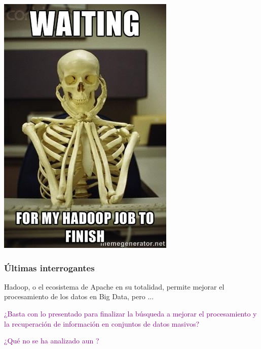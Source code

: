 \documentclass[
10pt, %
aspectratio=169, %
]{beamer}
\begin{document}
	\begin{frame}
		
		\centering
		\includegraphics[height=\paperheight]{break1.jpg}
		
	\end{frame}
	
	\begin{frame}
		
		\frametitle{Últimas interrogantes}
		
		Hadoop, o el ecosistema de Apache en su totalidad, permite mejorar el procesamiento de los datos en Big Data, pero ... 
		
		\vspace{2\baselineskip}
				
		\textcolor{purple}{¿Basta con lo presentado para finalizar la búsqueda a mejorar el procesamiento y la recuperación de información en conjuntos de datos masivos?}
		
		\vspace{1\baselineskip}
		
		\textcolor{purple}{¿Qué no se ha analizado aun ?}
		
		
	\end{frame}
	
\end{document}
